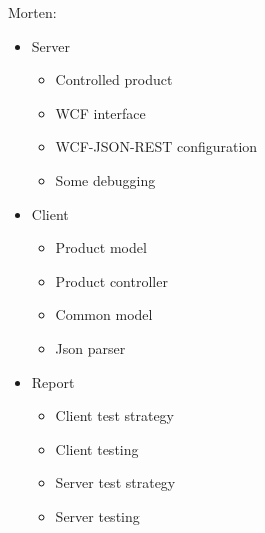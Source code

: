 Morten: 
\begin{itemize}
	\item Server
	\begin{itemize}
		\item Controlled product
		\item WCF interface
		\item WCF-JSON-REST configuration
		\item Some debugging
	\end{itemize}
	\item Client
	\begin{itemize}
		\item Product model
		\item Product controller
		\item Common model
		\item Json parser
	\end{itemize}
	\item Report
	\begin{itemize}
		\item Client test strategy
		\item Client testing
		\item Server test strategy
		\item Server testing	
	\end{itemize}
\end{itemize}